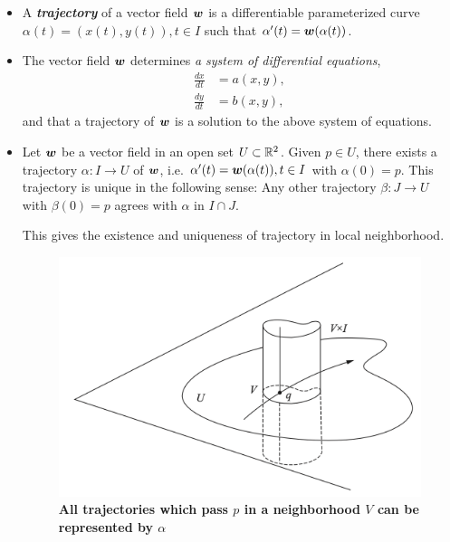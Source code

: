 \documentclass[11pt]{article}
\begin{document}
\begin{itemize}
\item  \begin{definition}
A \emph{\textbf{trajectory}} of a vector field $\boldsymbol{w}$ is a differentiable parameterized curve $\alpha(t)= (x(t), y(t)), t\in I$ such that $\alpha'(t) = \boldsymbol{w}(\alpha(t))$. 
\end{definition}

\item The vector field $\boldsymbol{w}$ determines \emph{a system of differential equations},
\begin{align*}
\frac{dx}{dt} &= a(x,y), \\
\frac{dy}{dt} &= b(x,y),
\end{align*}
and that a trajectory of $\boldsymbol{w}$ is a solution to the above system of equations.


\item \begin{theorem}\label{thm: unique_trajectory_1}
Let $\boldsymbol{w}$ be a vector field in an open set $U\subset {\mathbb R}^{2}$. Given $p\in U$, there exists a trajectory $\alpha: I\rightarrow U$ of $\boldsymbol{w}$, i.e. $\alpha'(t) = \boldsymbol{w}(\alpha(t)), t\in I$ with $\alpha(0)=p$. This trajectory is unique in the following sense: Any other trajectory $\beta: J \rightarrow U$ with $\beta(0)=p$ agrees with $\alpha$ in $I\cap J$.
\end{theorem}
This gives the existence and uniqueness of trajectory in local neighborhood. 

\begin{figure}[htb]
\centering
\begin{minipage}{0.6\linewidth}
 \centerline{\includegraphics[scale = 0.5]{local_flow.png}}
\end{minipage}
\caption{\scriptsize
\textbf{All trajectories which pass $p$ in a neighborhood $V$ can be represented by $\alpha$}}
\label{fig: local_flow}
\end{figure}



\end{itemize}
\end{document}
